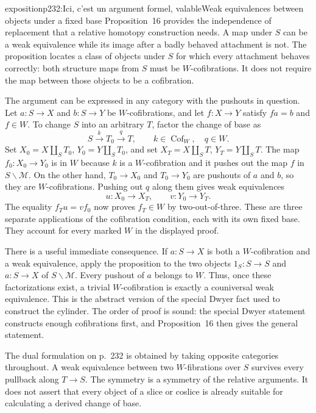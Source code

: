 \begin{dcomment}{exposition}{p232:Ici, c'est un argument formel, valable}{Weak equivalences between objects under a fixed base}
Proposition~16 provides the independence of replacement that a relative homotopy construction needs. A map under $S$ can be a weak equivalence while its image after a badly behaved attachment is not. The proposition locates a class of objects under $S$ for which every attachment behaves correctly: both structure maps from $S$ must be $W$-cofibrations. It does not require the map between those objects to be a cofibration.

The argument can be expressed in any category with the pushouts in question. Let $a:S\to X$ and $b:S\to Y$ be $W$-cofibrations, and let $f:X\to Y$ satisfy $fa=b$ and $f\in W$. To change $S$ into an arbitrary $T$, factor the change of base as
\[
 S\xrightarrow{k}T_0\xrightarrow{q}T,
 \qquad k\in\operatorname{Cof}_W,\quad q\in W.
\]
Set $X_0=X\amalg_ST_0$, $Y_0=Y\amalg_ST_0$, and set $X_T=X\amalg_ST$, $Y_T=Y\amalg_ST$. The map $f_0:X_0\to Y_0$ is in $W$ because $k$ is a $W$-cofibration and it pushes out the map $f$ in $S\backslash\mathcal M$. On the other hand, $T_0\to X_0$ and $T_0\to Y_0$ are pushouts of $a$ and $b$, so they are $W$-cofibrations. Pushing out $q$ along them gives weak equivalences
\[
 u:X_0\longrightarrow X_T,
 \qquad v:Y_0\longrightarrow Y_T.
\]
The equality $f_Tu=vf_0$ now proves $f_T\in W$ by two-out-of-three. These are three separate applications of the cofibration condition, each with its own fixed base. They account for every marked $W$ in the displayed proof.

There is a useful immediate consequence. If $a:S\to X$ is both a $W$-cofibration and a weak equivalence, apply the proposition to the two objects $1_S:S\to S$ and $a:S\to X$ of $S\backslash\mathcal M$. Every pushout of $a$ belongs to $W$. Thus, once these factorizations exist, a trivial $W$-cofibration is exactly a couniversal weak equivalence. This is the abstract version of the special Dwyer fact used to construct the cylinder. The order of proof is sound: the special Dwyer statement constructs enough cofibrations first, and Proposition~16 then gives the general statement.

The dual formulation on p.~232 is obtained by taking opposite categories throughout. A weak equivalence between two $W$-fibrations over $S$ survives every pullback along $T\to S$. The symmetry is a symmetry of the relative arguments. It does not assert that every object of a slice or coslice is already suitable for calculating a derived change of base.
\end{dcomment}

